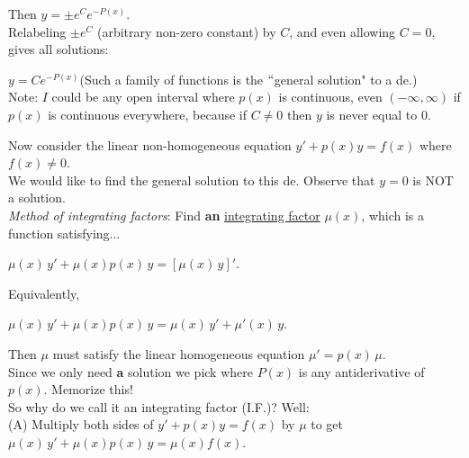 \documentclass{ximera}
\begin{document}
 Then $y=\pm e^C e^{-P(x)}$.  \\

 Relabeling $\pm e^C$ (arbitrary non-zero constant) by $C$,  and even allowing $C=0$, gives all solutions:

 $y=C e^{-P(x)}$\hfill  (Such a family of functions is the $``$general solution" to a de.)\\

 Note: $I$ could be any open interval where $p(x)$ is continuous, even $(-\infty,\infty)$ if $p(x)$ is continuous everywhere, because if $C\neq 0$ then $y$ is never equal to $0$.\\
\bigskip

 Now consider the linear non-homogeneous equation $y'+p(x)y=f(x)$ where $f(x)\neq 0$.  \\

 We would like to find the general solution to this de.  Observe that $y=0$ is NOT a solution.  \\

\emph{Method of integrating factors}:  Find \textbf{an} \underline{integrating factor} $\mu (x)$, which is a function satisfying... \\


 \begin{center} $\mu (x)\, y'+ \mu(x) p(x)\, y=[\mu(x)\, y]'$.\end{center}

\vspace{0.5cm}
 Equivalently,\\

 \begin{center} $\mu (x)\, y'+ \mu(x) p(x)\, y=\mu(x) \,y'+\mu'(x) \,y$.\end{center}

\vspace{1cm}

 Then $\mu$ must satisfy the linear homogeneous equation $\mu '=p(x)\, \mu$. \\

 Since we only need \textbf{a} solution we pick  where $P(x)$ is any antiderivative of $p(x)$.  Memorize this!\\

 So why do we call it an integrating factor (I.F.)?   Well:\\

 (A) Multiply both sides of $y'+p(x)y=f(x)$ by $\mu$  to get $\mu (x)\, y'+ \mu(x) p(x)\, y=\mu (x)f(x)$.\\
\end{document}
